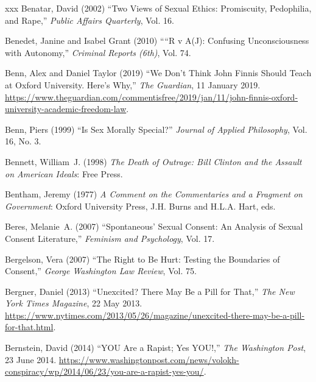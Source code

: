 \documentclass[]{jlreq} \usepackage{mystyle}
\begin{document}
\begin{thebibliography}{xxx}
Benatar, David (2002) ``Two Views of Sexual Ethics: Promiscuity, Pedophilia,
  and Rape,'' \textit{ Public Affairs Quarterly}, Vol. 16.

Benedet, Janine and Isabel Grant (2010) ``“R v A(J): Confusing
  Unconsciousness with Autonomy,'' \textit{ Criminal Reports (6th)}, Vol. 74.

Benn, Alex and Daniel Taylor (2019) ``We Don't Think John Finnis Should Teach
  at Oxford University. Here's Why,'' \emph{The Guardian}, 11 January 2019.
  \url{https://www.theguardian.com/commentisfree/2019/jan/11/john-finnis-oxford-university-academic-freedom-law}.

Benn, Piers (1999) ``Is Sex Morally Special?'' \textit{ Journal of Applied
  Philosophy}, Vol. 16, No. 3.

Bennett, William~J. (1998)  \textit{ The Death of Outrage: Bill Clinton and the
  Assault on American Ideals}: Free Press.

Bentham, Jeremy (1977)  \textit{ A Comment on the Commentaries and a Fragment
  on Government}: Oxford University Press, J.H. Burns and H.L.A. Hart, eds.

Beres, Melanie~A. (2007) ``Spontaneous' Sexual Consent: An Analysis of Sexual
  Consent Literature,'' \textit{ Feminism and Psychology}, Vol. 17.

Bergelson, Vera (2007) ``The Right to Be Hurt: Testing the Boundaries of
  Consent,'' \textit{ George Washington Law Review}, Vol. 75.

Bergner, Daniel (2013) ``Unexcited? There May Be a Pill for That,'' \emph{The
  New York Times Magazine}, 22 May 2013.
  \url{https://www.nytimes.com/2013/05/26/magazine/unexcited-there-may-be-a-pill-for-that.html}.

Bernstein, David (2014) ``YOU Are a Rapist; Yes YOU!,'' \emph{The Washington
  Post}, 23 June 2014.
  \url{https://www.washingtonpost.com/news/volokh-conspiracy/wp/2014/06/23/you-are-a-rapist-yes-you/}.


\end{thebibliography}
\end{document}
